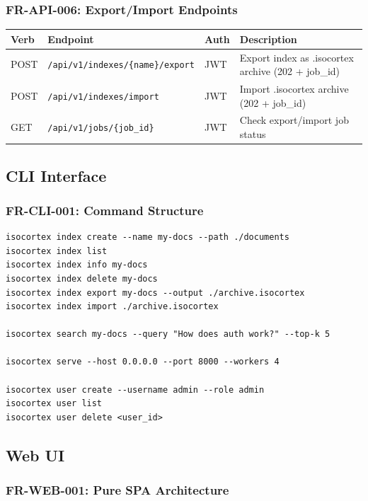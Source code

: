 \documentclass[11pt,a4paper]{article}
\newcommand{\apipath}[1]{\texttt{\small\textcolor{ctAccentBlue}{#1}}}
\begin{document}
\subsubsection{FR-API-006: Export/Import Endpoints}

\begin{longtable}{@{}p{1.5cm}p{4.5cm}p{3cm}p{5cm}@{}}
\toprule
\textbf{Verb} & \textbf{Endpoint} & \textbf{Auth} & \textbf{Description} \\
\midrule
\endhead
POST & \apipath{/api/v1/indexes/\{name\}/export} & JWT & Export index as .isocortex archive (202 + job\_id) \\
POST & \apipath{/api/v1/indexes/import} & JWT & Import .isocortex archive (202 + job\_id) \\
GET & \apipath{/api/v1/jobs/\{job\_id\}} & JWT & Check export/import job status \\
\bottomrule
\end{longtable}

\subsection{CLI Interface}

\subsubsection{FR-CLI-001: Command Structure}

\begin{lstlisting}[language={},title={CLI Commands}]
isocortex index create --name my-docs --path ./documents
isocortex index list
isocortex index info my-docs
isocortex index delete my-docs
isocortex index export my-docs --output ./archive.isocortex
isocortex index import ./archive.isocortex

isocortex search my-docs --query "How does auth work?" --top-k 5

isocortex serve --host 0.0.0.0 --port 8000 --workers 4

isocortex user create --username admin --role admin
isocortex user list
isocortex user delete <user_id>
\end{lstlisting}

\subsection{Web UI}

\subsubsection{FR-WEB-001: Pure SPA Architecture}
\end{document}

